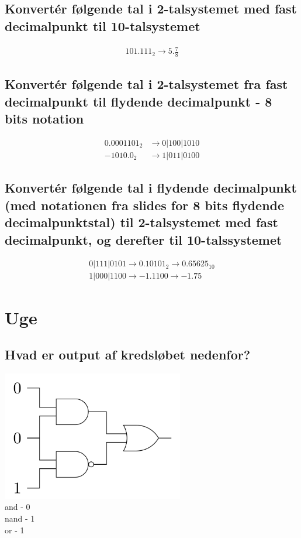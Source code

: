 \documentclass[12pt, a4paper]{article}
\begin{document}
			\subsection{Konvertér følgende tal i 2-talsystemet med fast decimalpunkt til 10-talsystemet}
				\begin{align*}
					101.111_2 \rightarrow 5.\frac{7}{8}
				\end{align*}
			\subsection{Konvertér følgende tal i 2-talsystemet fra fast decimalpunkt til flydende decimalpunkt - 8 bits notation}
				\begin{align*}
					0.0001101_2 &\rightarrow 0|100|1010 \\
					-1010.0_2 &\rightarrow 1|011|0100
				\end{align*}
			\subsection{Konvertér følgende tal i flydende decimalpunkt (med notationen fra slides for 8 bits flydende decimalpunktstal) til 2-talsystemet med fast decimalpunkt, og derefter til 10-talssystemet}
				\begin{align*}
					0|111|0101 \rightarrow 0.10101_2 \rightarrow 0.65625_{10}\\
					1|000|1100 \rightarrow -1.1100 \rightarrow -1.75
				\end{align*}
			\section{Uge}
				\subsection{Hvad er output af kredsløbet nedenfor?}
					\includegraphics[width=300px]{images/gates38.1.pdf}\\
					and - 0\\
					nand - 1\\
					or - 1
\end{document}
